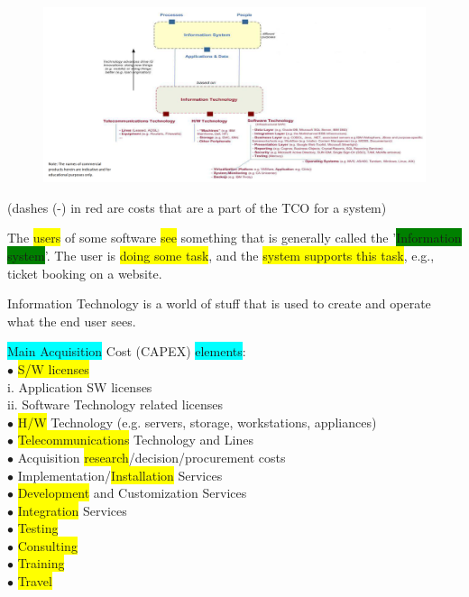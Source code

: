 \documentclass[]{project_plan}
\newcommand{\bulletPoint}{\hspace{-3.1pt}$\bullet$ \hspace{5pt}}
\begin{document}
\begin{figure}[h!]
  \centering
  \includegraphics[width=\linewidth]{TCO.png}
\end{figure}

(dashes (-) in red are costs that are a part of the TCO for a system)

The \colorbox{yellow}{users} of some software \colorbox{yellow}{see} something that is generally called the '\colorbox{green}{Information system}'.
The user is \colorbox{yellow}{doing some task}, and the \colorbox{yellow}{system supports this task}, e.g., ticket booking on a website.

Information Technology is a world of stuff that is used to create and operate
what the end user sees.

\newpage

\colorbox{cyan}{Main Acquisition} Cost (CAPEX) \colorbox{cyan}{elements}:\\
\bulletPoint \colorbox{yellow}{S/W licenses}\\
i. Application SW licenses\\
ii. Software Technology related licenses\\
\bulletPoint \colorbox{yellow}{H/W} Technology (e.g. servers, storage, workstations, appliances)\\
\bulletPoint \colorbox{yellow}{Telecommunications} Technology and Lines\\
\bulletPoint Acquisition \colorbox{yellow}{research}/decision/procurement costs\\
\bulletPoint Implementation/\colorbox{yellow}{Installation} Services\\
\bulletPoint \colorbox{yellow}{Development} and Customization Services\\
\bulletPoint \colorbox{yellow}{Integration} Services\\
\bulletPoint \colorbox{yellow}{Testing}\\
\bulletPoint \colorbox{yellow}{Consulting}\\
\bulletPoint \colorbox{yellow}{Training}\\
\bulletPoint \colorbox{yellow}{Travel}
\end{document}
